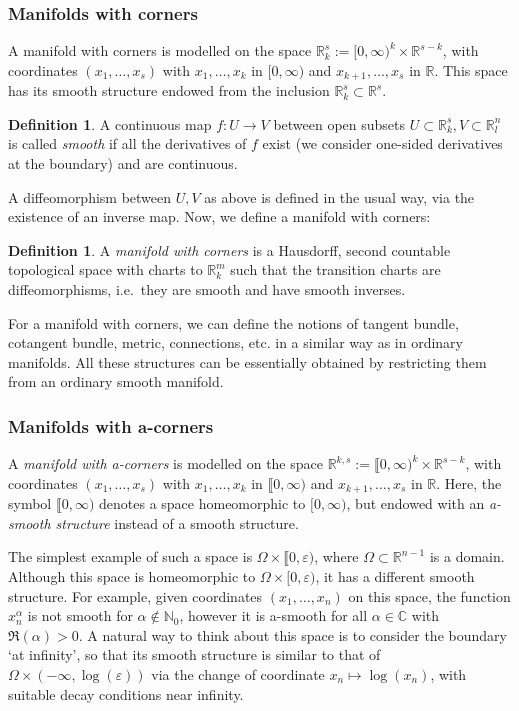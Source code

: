 \documentclass[10pt, a4paper]{article}
\theoremstyle{plain}%
\theoremstyle{definition}
\newtheorem{defn}[theorem]{Definition}
\numberwithin{figure}{section}
\numberwithin{equation}{section}
\newcommand{\bR}{\mathbb{R}}
\newcommand{\bC}{\mathbb{C}}
\newcommand{\bN}{\mathbb{N}}
\newcommand{\ep}{\varepsilon}
\begin{document}
\subsubsection{Manifolds with corners}
A manifold with corners is modelled on the space $\mathbb{R}^s_k:=[0,\infty)^k\times\bR^{s-k}$, with coordinates $(x_1,\dots,x_s)$ with $x_1,\dots,x_k$ in $[0,\infty)$ and $x_{k+1},\dots,x_s$ in $\bR$. This space has its smooth structure endowed from the inclusion $\bR^s_k\subset \bR^s$.


\begin{defn}
	A continuous map $f:U\rightarrow V$ between open subsets $U\subset \mathbb{R}^s_k, V\subset \mathbb{R}^n_l$ is called \textit{smooth} if all the derivatives of $f$ exist (we consider one-sided derivatives at the boundary) and are continuous.  
\end{defn}
A diffeomorphism between $U,V$ as above is defined in the usual way, via the existence of an inverse map. Now, we define a manifold with corners:
\begin{defn}
	A \textit{manifold with corners} is a Hausdorff, second countable topological space with charts to $\mathbb{R}^m_k$ such that the transition charts are diffeomorphisms, i.e.\ they are smooth and have smooth inverses.
\end{defn}

For a manifold with corners, we can define the notions of tangent bundle, cotangent bundle, metric, connections, etc. in a similar way as in ordinary manifolds. All these structures can be essentially obtained by restricting them from an ordinary smooth manifold.

\subsubsection{Manifolds with a-corners}
A \textit{manifold with a-corners} is modelled on the space $\bR^{k,s}:=\llbracket 0,\infty)^k\times\bR^{s-k}$, with coordinates $(x_1,\dots,x_s)$ with $x_1,\dots,x_k$ in $\llbracket0,\infty)$ and $x_{k+1},\dots,x_s$ in $\bR$. Here, the symbol $\llbracket 0,\infty)$ denotes a space homeomorphic to $[0,\infty)$, but endowed with an \textit{a-smooth structure} instead of a smooth structure.

The simplest example of such a space is $\Omega\times \llbracket 0,\ep)$, where $\Omega \subset \bR^{n-1}$ is a domain. Although this space is homeomorphic to $\Omega\times[0,\ep)$, it has a different smooth structure. For example, given coordinates $(x_1,\dots,x_n)$ on this space, the function $x_n^\alpha$ is not smooth for $\alpha\not \in \bN_0$, however it is a-smooth for all $\alpha\in \bC$ with $\Re(\alpha)>0$. A natural way to think about this space is to consider the boundary `at infinity', so that its smooth structure is similar to that of $\Omega \times (-\infty, \log(\ep))$ via the change of coordinate $x_n\mapsto \log(x_n)$, with suitable decay conditions near infinity.
\end{document}
